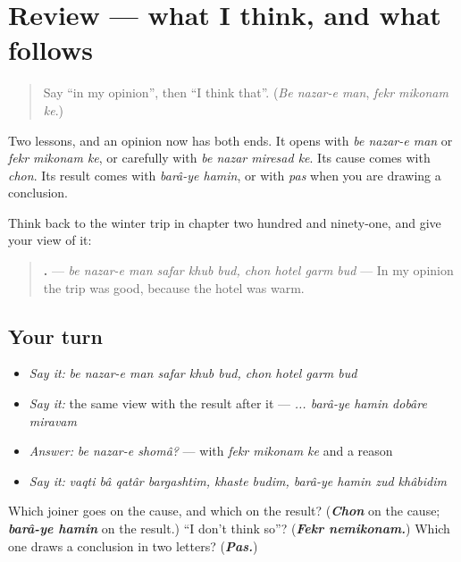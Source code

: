 \section[(review)]{Review — what I think, and what follows}

\label{lesson:FA-R292-opinion-and-result}



\begin{quote}
Say \textquotedblleft{}in my opinion\textquotedblright{}, then \textquotedblleft{}I think that\textquotedblright{}. (\emph{Be nazar-e man}, \emph{fekr mikonam ke}.)
\end{quote}

\begin{grammarlens}[title={What you've built}]
Two lessons, and an opinion now has both ends. It opens with \emph{be nazar-e man} or \emph{fekr mikonam ke}, or carefully with \emph{be nazar miresad ke}. Its cause comes with \emph{chon}. Its result comes with \emph{barâ-ye hamin}, or with \emph{pas} when you are drawing a conclusion.

Think back to the winter trip in chapter two hundred and ninety-one, and give your view of it:

\begin{quote}
\textbf{         .} — \emph{be nazar-e man safar khub bud, chon hotel garm bud} — In my opinion the trip was good, because the hotel was warm.
\end{quote}
\end{grammarlens}

\subsection*{Your turn}
\begin{itemize}
\raggedright
  \item \emph{Say it:} \emph{be nazar-e man safar khub bud, chon hotel garm bud}
  \item \emph{Say it:} the same view with the result after it — \emph{... barâ-ye hamin dobâre miravam}
  \item \emph{Answer:} \emph{be nazar-e shomâ?} — with \emph{fekr mikonam ke} and a reason
  \item \emph{Say it:} \emph{vaqti bâ qatâr bargashtim, khaste budim, barâ-ye hamin zud khâbidim}
\end{itemize}

\begin{tcolorbox}[breakable,colback=teal!4,colframe=teal!35!black,title={Before you move on}]
Which joiner goes on the cause, and which on the result? (\emph{\textbf{Chon}} on the cause; \emph{\textbf{barâ-ye hamin}} on the result.) \textquotedblleft{}I don't think so\textquotedblright{}? (\emph{\textbf{Fekr nemikonam.}}) Which one draws a conclusion in two letters? (\emph{\textbf{Pas.}})
\end{tcolorbox}
